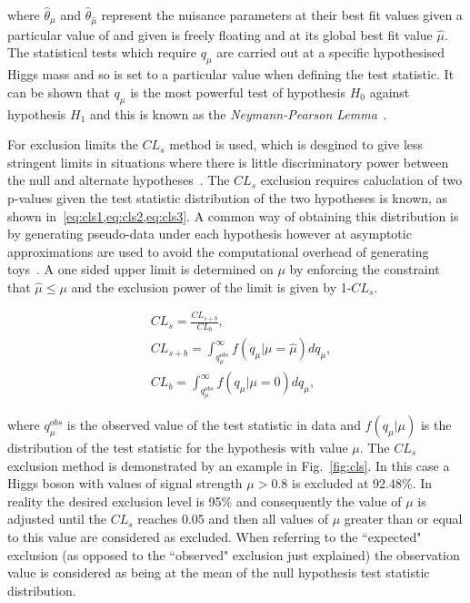 where $\hat{\theta}_{\mu}$ and $\hat{\theta}_{\hat{\mu}}$ represent the nuisance parameters at their best fit values given a particular value of \mu and given \mu is freely floating and at its global best fit value $\hat{\mu}$. The statistical tests which require $q_{\mu}$ are carried out at a specific hypothesised Higgs mass and so \mH is set to a particular value when defining the test statistic. It can be shown that $q_{\mu}$ is the most powerful test of hypothesis $H_{0}$ against hypothesis $H_{1}$ and this is known as the \textit{Neymann-Pearson Lemma}~\cite{FredJames}.

For exclusion limits the $CL_{s}$ method is used, which is desgined to give less stringent limits in situations where there is little discriminatory power between the null and alternate hypotheses~\cite{cls}. The $CL_{s}$ exclusion requires caluclation of two p-values given the test statistic distribution of the two hypotheses is known, as shown in~\cref{eq:cls1,eq:cls2,eq:cls3}. A common way of obtaining this distribution is by generating pseudo-data under each hypothesis however at \CMS asymptotic approximations are used to avoid the computational overhead of generating toys~\cite{asymptotic_form}. A one sided upper limit is determined on $\mu$ by enforcing the constraint that $\hat{\mu}\leq\mu$ and the exclusion power of the limit is given by 1-$CL_{s}$. 

\begin{align}
  & CL_{s} = \frac{CL_{s+b}}{CL_{b}} \label{eq:cls1}, \\
  & CL_{s+b} = \int_{q_{\mu}^{obs}}^{\infty}f(q_{\mu}|\mu=\hat{\mu})dq_{\mu} \label{eq:cls2}, \\
  & CL_{b} = \int_{q_{\mu}^{obs}}^{\infty}f(q_{\mu}|\mu=0)dq_{\mu} \label{eq:cls3}, 
\end{align}

where $q_{\mu}^{obs}$ is the observed value of the test statistic in data and $f(q_{\mu}|\mu)$ is the distribution of the test statistic for the hypothesis with value $\mu$. The $CL_{s}$ exclusion method is demonstrated by an example in Fig.~\ref{fig:cls}. In this case a \SM Higgs boson with values of signal strength $\mu>0.8$ is excluded at 92.48\%. In reality the desired exclusion level is 95\% and consequently the value of $\mu$ is adjusted until the $CL_{s}$ reaches 0.05 and then all values of $\mu$ greater than or equal to this value are considered as excluded. When referring to the ``expected" exclusion (as opposed to the ``observed" exclusion just explained) the observation value is considered as being at the mean of the null hypothesis test statistic distribution.

